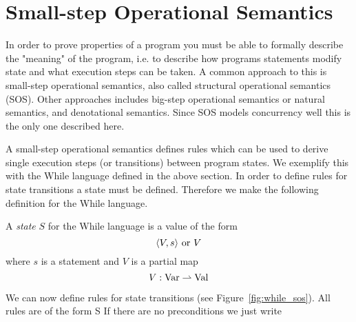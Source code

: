 \section{Small-step Operational Semantics} \label{sec:language_semantics}

In order to prove properties of a program you must be able to formally describe
the "meaning" of the program, i.e. to describe how programs statements modify
state and what execution steps can be taken. A common approach to this is
small-step operational semantics, also called structural operational semantics
(SOS). Other approaches includes big-step operational semantics or natural
semantics, and denotational semantics. Since SOS models concurrency well this is
the only one described here.

A small-step operational semantics defines rules which can be used to derive
single execution steps (or transitions) between program states. We exemplify
this with the While language defined in the above section. In order to define
rules for state transitions a state must be defined. Therefore we make the
following definition for the While language.

\begin{definition}
  A \emph{state} $S$ for the While language is a value of the form
  \begin{equation*}
    \langle V, s \rangle \text{ or } V
  \end{equation*}
  where $s$ is a statement and $V$ is a partial map
  \begin{equation*}
    V: \mbox{$\mathrm{Var}$} \rightharpoonup \mbox{$\mathrm{Val}$}
  \end{equation*}
\end{definition}

We can now define rules for state transitions (see Figure~\ref{fig:while_sos}).
All rules are of the form
{ \rightarrow S}
If there are no preconditions we just write


